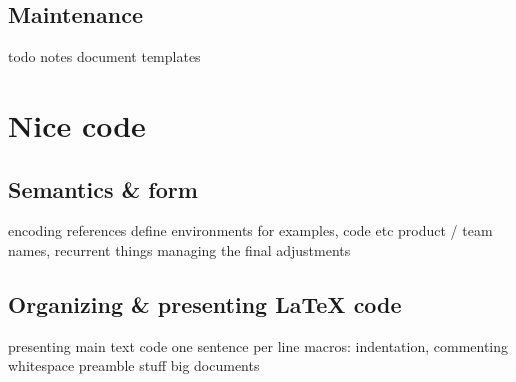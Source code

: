 \documentclass[a4paper,twoside,nofonts]{tufte-handout}
\begin{document}
\subsection{Maintenance} %
\label{sub:maintenance}

\begin{todoenv}
    todo notes
    document templates
\end{todoenv}



\clearpage
\section{Nice code} %
\label{sec:code}

\subsection{Semantics \& form} %
\label{sub:semantics}

\begin{todoenv}
    encoding
    references
    define environments for examples, code etc
    product / team names, recurrent things
    managing the final adjustments
\end{todoenv}

\subsection{Organizing \& presenting \LaTeX{} code} %
\label{sub:format}

\begin{todoenv}
    presenting main text code
    one sentence per line
    macros: indentation, commenting whitespace
    preamble stuff
    big documents
\end{todoenv}



\clearpage

\nocite{*}


\clearpage\todos
\end{document}
